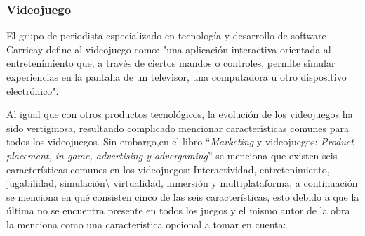 \subsubsection{Videojuego}
El grupo de periodista especializado en tecnología y desarrollo de software
Carricay define al videojuego como: "una aplicación interactiva orientada
al entretenimiento que, a través de ciertos mandos o controles, permite simular
experiencias en la pantalla de un televisor, una computadora u otro dispositivo
electrónico"\cite{Ref_DefVideo}.
\\
\par
Al igual que con otros productos tecnológicos, la evolución de los videojuegos
ha sido vertiginosa, resultando complicado mencionar características comunes
para todos los videojuegos. Sin embargo,en el libro “\textit{Marketing} y videojuegos:
\textit{Product placement, in-game, advertising y
advergaming}” se menciona que existen seis características comunes en los
videojuegos: Interactividad, entretenimiento, jugabilidad, simulación\textbackslash
virtualidad, inmersión y multiplataforma\cite{RefCarac}; a continuación se
menciona en qué consisten cinco de las seis características, esto debido a que
la última no se encuentra presente en todos los juegos y el mismo autor de la
obra la menciona como una característica opcional a tomar en cuenta:

